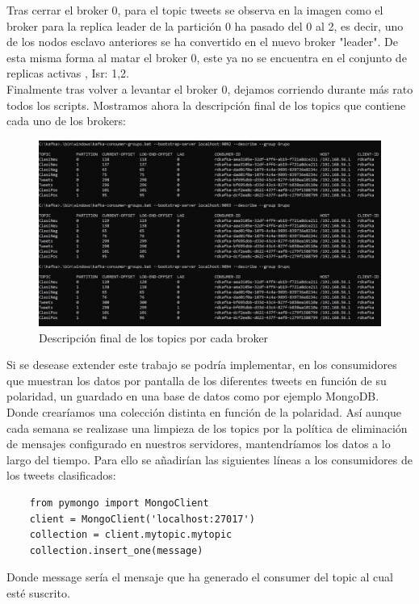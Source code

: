 \documentclass[12pt, a4paper, twoside]{article}
\begin{document}
Tras cerrar el broker 0, para el topic tweets se observa en la imagen como el broker para la replica leader de la partición 0 ha pasado del 0 al 2, es decir, uno de los nodos esclavo anteriores se ha convertido en el nuevo broker "leader". De esta misma forma al matar el broker 0, este ya no se encuentra
en el conjunto de replicas activas , Isr: 1,2.\\



Finalmente tras volver a levantar el broker 0, dejamos corriendo durante más rato todos los scripts. 
Mostramos ahora la descripción final de los topics que contiene cada uno de los brokers:


\begin{figure}[h]
		\centering
		\includegraphics[width=1.1\linewidth]{fin_codigo}
		\caption{Descripción final de los topics por cada broker}
			\end{figure}
\newpage
Si se desease extender este trabajo se podría implementar, en los consumidores que muestran los datos por pantalla de los diferentes tweets en función de su polaridad, un guardado en una base de datos como por ejemplo MongoDB. Donde crearíamos una colección distinta en función de la polaridad. Así aunque cada semana se realizase una limpieza de los topics por la política de eliminación de mensajes configurado en nuestros servidores, mantendríamos los datos a lo largo del tiempo.
Para ello se añadirían las siguientes líneas a los consumidores de los tweets clasificados:\newline


	\begin{verbatim}
	from pymongo import MongoClient
	client = MongoClient('localhost:27017')
	collection = client.mytopic.mytopic
	collection.insert_one(message)
	\end{verbatim}




Donde message sería el mensaje que ha generado el consumer del topic al cual esté suscrito.
\end{document}

